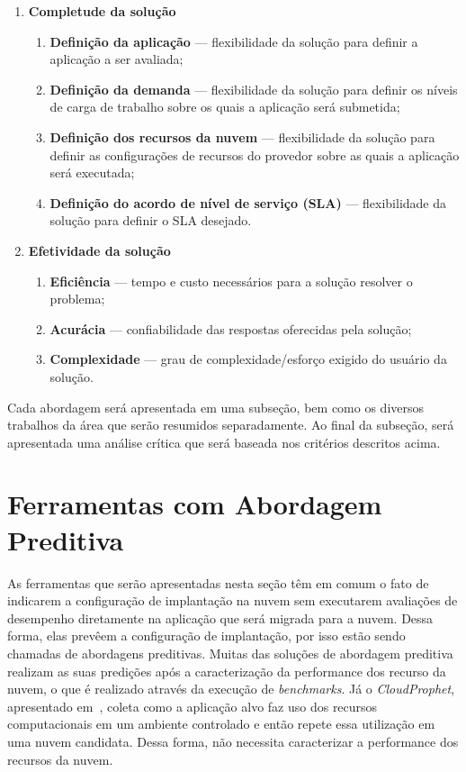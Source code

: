 \begin{enumerate}
  \item \textbf{Completude da solução}
  \begin{enumerate}
    \item \textbf{Definição da aplicação} --- flexibilidade da solução para
    definir a aplicação a ser avaliada;
    \item \textbf{Definição da demanda} --- flexibilidade da solução para
    definir os níveis de carga de trabalho sobre os quais a aplicação será
    submetida;
	\item \textbf{Definição dos recursos da nuvem} --- flexibilidade da solução
	para definir as configurações de recursos do provedor sobre as quais a aplicação
	será executada;
	\item \textbf{Definição do acordo de nível de serviço (SLA)} --- flexibilidade
	da solução para definir o SLA desejado.
  \end{enumerate}
  \item \textbf{Efetividade da solução}  
  \begin{enumerate}
    \item \textbf{Eficiência} --- tempo e custo necessários para a solução
    resolver o problema;
    \item \textbf{Acurácia} --- confiabilidade das respostas oferecidas pela
    solução;
	\item \textbf{Complexidade} --- grau de complexidade/esforço exigido do usuário
	da solução.
  \end{enumerate}
\end{enumerate}

Cada abordagem será apresentada em uma subseção, bem como os diversos trabalhos da área que serão resumidos separadamente. Ao final da subseção, será apresentada uma análise crítica que será baseada nos critérios descritos acima.

\section{Ferramentas com Abordagem Preditiva}
As ferramentas que serão apresentadas nesta seção têm em comum o fato de
indicarem a configuração de implantação na nuvem sem executarem avaliações de
desempenho diretamente na aplicação que será migrada para a nuvem. Dessa forma,
elas prevêem a configuração de implantação, por isso estão sendo chamadas de
abordagens preditivas. Muitas das soluções de abordagem preditiva realizam as
suas predições após a caracterização da performance dos recurso da nuvem, o que
é realizado através da execução de \textit{benchmarks}. Já o
\textit{CloudProphet}, apresentado em~\cite{li2011cloudprophet}, coleta como a
aplicação alvo faz uso dos recursos computacionais em um ambiente controlado e
então repete essa utilização em uma nuvem candidata. Dessa forma, não necessita
caracterizar a performance dos recursos da nuvem.

